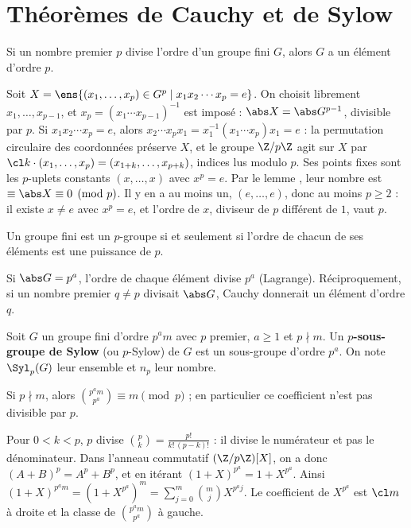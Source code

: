 \section{Théorèmes de Cauchy et de Sylow}
\begin{theoreme}[Cauchy]\label{thm-cauchy}
Si un nombre premier $p$ divise l'ordre d'un groupe fini $G$, alors $G$ a un élément d'ordre $p$.
\end{theoreme}
\begin{preuve}
Soit $X=\ens{(x_1,\dots,x_p)\in G^p\mid x_1x_2\cdots x_p=e}$. On choisit librement $x_1,\dots,x_{p-1}$, et $x_p=(x_1\cdots x_{p-1})^{-1}$ est imposé : $\abs X=\abs G^{p-1}$, divisible par $p$. Si $x_1x_2\cdots x_p=e$, alors $x_2\cdots x_px_1=x_1^{-1}(x_1\cdots x_p)x_1=e$ : la permutation circulaire des coordonnées préserve $X$, et le groupe $\Z/p\Z$ agit sur $X$ par $\cl k\cdot(x_1,\dots,x_p)=(x_{1+k},\dots,x_{p+k})$, indices lus modulo $p$. Ses points fixes sont les $p$-uplets constants $(x,\dots,x)$ avec $x^p=e$. Par le lemme , leur nombre est $\equiv\abs X\equiv0\pmod p$. Il y en a au moins un, $(e,\dots,e)$, donc au moins $p\ge2$ : il existe $x\neq e$ avec $x^p=e$, et l'ordre de $x$, diviseur de $p$ différent de $1$, vaut $p$.
\end{preuve}
\begin{corollaire}\label{cor-p-groupe-ordres}
Un groupe fini est un $p$-groupe si et seulement si l'ordre de chacun de ses éléments est une puissance de $p$.
\end{corollaire}
\begin{preuve}
Si $\abs G=p^a$, l'ordre de chaque élément divise $p^a$ (Lagrange). Réciproquement, si un nombre premier $q\neq p$ divisait $\abs G$, Cauchy donnerait un élément d'ordre $q$.
\end{preuve}
\begin{definition}
Soit $G$ un groupe fini d'ordre $p^am$ avec $p$ premier, $a\ge1$ et $p\nmid m$. Un \textbf{$p$-sous-groupe de Sylow} (ou $p$-Sylow) de $G$ est un sous-groupe d'ordre $p^a$. On note $\Syl_p(G)$ leur ensemble et $n_p$ leur nombre.
\end{definition}
\begin{lemme}\label{lem-binomial}
Si $p\nmid m$, alors $\binom{p^am}{p^a}\equiv m\pmod p$ ; en particulier ce coefficient n'est pas divisible par $p$.
\end{lemme}
\begin{preuve}
Pour $0<k<p$, $p$ divise $\binom pk=\frac{p!}{k!\,(p-k)!}$ : il divise le numérateur et pas le dénominateur. Dans l'anneau commutatif $(\Z/p\Z)[X]$, on a donc $(A+B)^p=A^p+B^p$, et en itérant $(1+X)^{p^a}=1+X^{p^a}$. Ainsi $(1+X)^{p^am}=(1+X^{p^a})^m=\sum_{j=0}^m\binom mj X^{p^aj}$. Le coefficient de $X^{p^a}$ est $\cl m$ à droite et la classe de $\binom{p^am}{p^a}$ à gauche.
\end{preuve}
